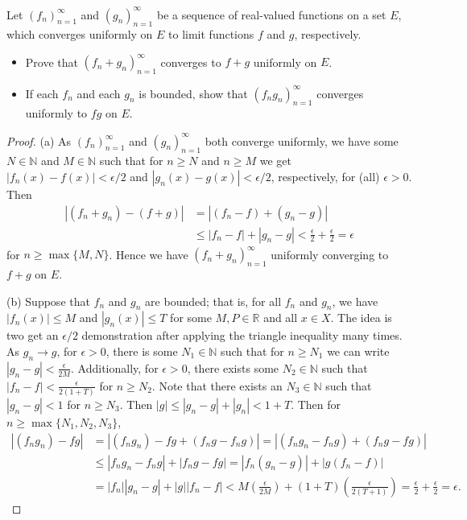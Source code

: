 \documentclass[oneside]{amsart}
\theoremstyle{definition}
\newcommand{\rr}{\mathbb R}
\newcommand{\nn}{\mathbb N}
\begin{document}
\begin{tcolorbox}[colback=black!5!white,colframe=black!75!black,title= Exercise $3.2.$] Let $(f_n)_{n=1}^\infty$ and $(g_n)_{n=1}^\infty$ be a sequence of real-valued functions on a set $E$, which converges uniformly on $E$ to limit functions $f$ and $g$, respectively. 
\begin{itemize}
	\item [(a)] Prove that $(f_n+g_n)_{n=1}^\infty$ converges to $f+g$ uniformly on $E$.
	\item [(b)] If each $f_n$ and each $g_n$ is bounded, show that $(f_n g_n)_{n=1}^\infty$ converges uniformly to $fg$ on $E$.
\end{itemize}
\tcblower 
\begin{proof} (a) As $(f_n)_{n=1}^\infty$ and $(g_n)^\infty_{n=1}$ both converge uniformly, we have some $N \in \nn$ and $M \in \nn$ such that for $n \geq N$ and $n \geq M$ we get $ |f_n(x) -f(x)| < \epsilon/2$ and $|g_n(x) - g(x)| < \epsilon/2$, respectively,  for (all) $\epsilon > 0$. Then 
\begin{align*}
|(f_n+g_n)-(f+g)| &= |(f_n-f)+(g_n-g)| \\ &\leq |f_n-f| + |g_n-g| < \frac{\epsilon}{2} + \frac{\epsilon}{2} = \epsilon
\end{align*}
for $ n \geq \max \{M,N\}$. Hence we have $(f_n+g_n)_{n=1}^\infty$ uniformly converging to $f+g$ on $E$.

(b) Suppose that $f_n$ and $g_n$ are bounded; that is, for all $f_n$ and $g_n$, we have $|f_n(x) | \leq M$ and $|g_n(x)| \leq T$ for some $M,P \in \rr$ and all $x \in X$. The idea is two get an $\epsilon/2$ demonstration after applying the triangle inequality many times. As $g_n \to g$, for $\epsilon>0$, there is some $N_1 \in \nn$ such that for $n \geq N_1$ we can write $|g_n-g| < \frac{\epsilon}{2M}$. Additionally, for $\epsilon >0$, there exists some $N_2 \in \nn$ such that $|f_n - f| < \frac{\epsilon}{2(1+T)}$ for $n \geq N_2$. Note that there exists an $N_3 \in \nn$ such that $|g_n -g| < 1$ for $n \geq N_3$. Then $|g| \leq |g_n - g| +|g_n| < 1+T$. Then for $n \geq \max \{N_1, N_2, N_3 \}$,
\begin{align*}
	|(f_ng_n) -fg| & = |(f_n g_n) - fg + (f_n g- f_ng)| = |(f_ng_n-f_ng)+(f_ng-fg)| \\
	&\leq |f_ng_n-f_ng|+|f_n g-fg| = |f_n (g_n-g)|+|g(f_n-f)| \\
	&= |f_n||g_n-g| + |g||f_n-f| < M \left( \frac{\epsilon}{2M} \right) + (1+T)\left (\frac{\epsilon}{2(T+1)} \right ) = \frac{\epsilon}{2} +\frac{\epsilon}{2} = \epsilon.
\end{align*}

\end{proof}
\end{tcolorbox}
\end{document}
